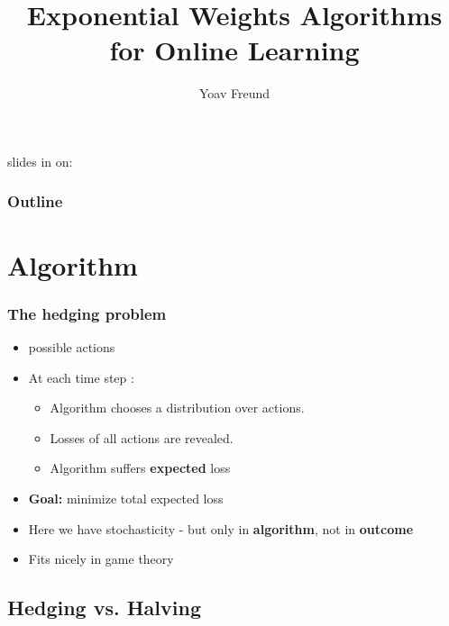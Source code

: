 \documentclass[handout]{beamer}
\title[\ouralg] %
{Exponential Weights Algorithms for Online Learning}
\author[Freund] %
{Yoav Freund}
\institute[Universities of Somewhere and Elsewhere] %
\begin{document}

\begin{frame}
  \titlepage
  \begin{small}
    slides in  on:\\ 
  \end{small}
\end{frame}

\begin{frame}
  \frametitle{Outline}
  \tableofcontents[pausesections]
\end{frame}


\section{\ouralg Algorithm}

\begin{frame}
\frametitle{The hedging problem}

\begin{itemize}
\item {} possible actions 

\item At each time step :
\begin{itemize}
\item Algorithm chooses a distribution  over actions.
\item Losses  of all actions  are revealed.
\item Algorithm suffers {\bf expected} loss 
\end{itemize}
\item {{\bf Goal:} minimize total expected loss}
\item {Here we have stochasticity - but only in {\bf algorithm}, not in {\bf outcome}}
\item {Fits nicely in game theory}
\end{itemize}
\end{frame}

\subsection{Hedging vs. Halving}
\end{document}
